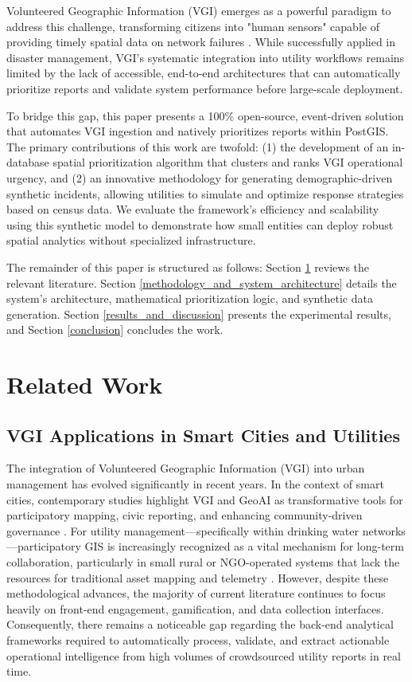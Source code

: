 \documentclass[conference]{IEEEtran}
\renewcommand\hl[1]{#1}
\begin{document}
\hl{Volunteered Geographic Information (VGI) emerges as a powerful paradigm to address this challenge}, transforming citizens into "human sensors" capable of providing timely spatial data on network failures \cite{goodchild2007}. While \hl{successfully applied in disaster management, VGI's systematic integration into utility workflows} remains limited by the lack of accessible, end-to-end architectures that can \hl{automatically} prioritize reports and validate system performance before large-scale deployment.

\hl{To bridge this gap, this paper presents a 100\% open-source, event-driven solution that automates VGI ingestion and natively prioritizes reports within PostGIS. The primary contributions of this work are twofold: (1) the development of an in-database spatial prioritization algorithm that clusters and ranks VGI operational urgency, and (2) an innovative methodology for generating demographic-driven synthetic incidents, allowing utilities to simulate and optimize response strategies based on census data. We evaluate the framework's efficiency and scalability using this synthetic model to demonstrate how small entities can deploy robust spatial analytics without specialized infrastructure.}

\hl{The remainder of this paper is structured as follows:} Section \ref{related_work} \hl{reviews the relevant literature.} Section \ref{methodology_and_system_architecture} \hl{details the system's architecture, mathematical prioritization logic, and synthetic data generation.} Section \ref{results_and_discussion} \hl{presents the experimental results, and} Section \ref{conclusion} \hl{concludes the work.}

\section{Related Work}
\label{related_work}

\subsection{VGI Applications in Smart Cities and Utilities}

The integration of Volunteered Geographic Information (VGI) into urban management has evolved significantly in recent years. In the context of smart cities, contemporary studies highlight VGI and GeoAI as transformative tools for participatory mapping, civic reporting, and enhancing community-driven governance \cite{kumas2025, naghavi2022}. For utility management—specifically within drinking water networks—participatory GIS is increasingly recognized as a vital mechanism for long-term collaboration, particularly in small rural or NGO-operated systems that lack the resources for traditional asset mapping and telemetry \cite{mcdonald2025}. However, despite these methodological advances, the majority of current literature continues to focus heavily on front-end engagement, gamification, and data collection interfaces. Consequently, there remains a noticeable gap regarding the back-end analytical frameworks required to automatically process, validate, and extract actionable operational intelligence from high volumes of crowdsourced utility reports in real time.
\end{document}
